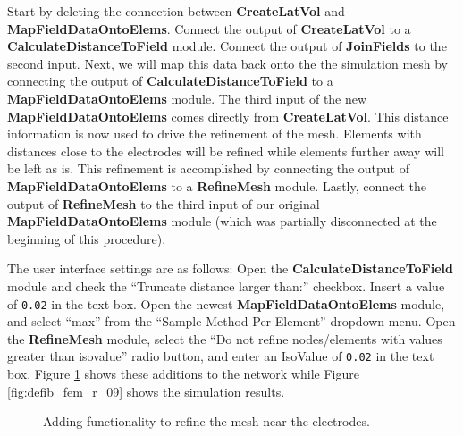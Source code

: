 \documentclass[fleqn,11pt,openany]{book}
\begin{document}
Start by deleting the connection between {\bf CreateLatVol} and {\bf
MapFieldDataOntoElems}. Connect the output of {\bf CreateLatVol} to a
{\bf CalculateDistanceToField} module. Connect the output of {\bf
JoinFields} to the second input. Next, we will map this data back onto
the the simulation mesh by connecting the output of {\bf
CalculateDistanceToField} to a {\bf MapFieldDataOntoElems} module. The
third input of the new {\bf MapFieldDataOntoElems} comes directly from
{\bf CreateLatVol}. This distance information is now used to drive the
refinement of the mesh. Elements with distances close to the
electrodes will be refined while elements further away will be left as
is. This refinement is accomplished by connecting the output of {\bf
MapFieldDataOntoElems} to a {\bf RefineMesh} module. Lastly, connect
the output of {\bf RefineMesh} to the third input of our original {\bf
MapFieldDataOntoElems} module (which was partially disconnected at the
beginning of this procedure).

The user interface settings are as follows: Open the {\bf
CalculateDistanceToField} module and check the ``Truncate distance
larger than:'' checkbox. Insert a value of {\tt 0.02} in the text
box. Open the newest {\bf MapFieldDataOntoElems} module, and select
``max'' from the ``Sample Method Per Element'' dropdown menu. Open the
{\bf RefineMesh} module, select the ``Do not refine nodes/elements
with values greater than isovalue'' radio button, and enter an
IsoValue of {\tt 0.02} in the text box. Figure
\ref{fig:defib_fem_nw_09} shows these additions to the network while
Figure \ref{fig:defib_fem_r_09} shows the simulation results.

\begin{figure}
\caption{Adding functionality to refine the mesh near the
electrodes.}\label{fig:defib_fem_nw_09}
\end{figure}
\end{document}
